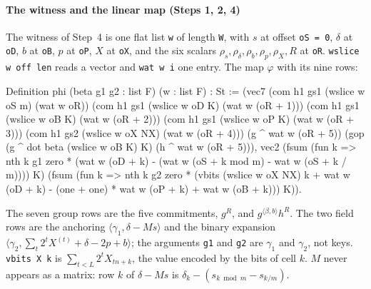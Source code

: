 \documentclass[11pt,a4paper]{article}
\newcommand{\rocq}[1]{\texttt{#1}}
\theoremstyle{remark}
\begin{document}
\paragraph{The witness and the linear map (Steps 1, 2, 4)} The witness of
Step~4 is one flat list \rocq{w} of length \rocq{W}, with $s$ at offset
\rocq{oS = 0}, $\delta$ at \rocq{oD}, $b$ at \rocq{oB}, $p$ at \rocq{oP},
$X$ at \rocq{oX}, and the six scalars $\rho_s, \rho_\delta, \rho_b,
\rho_p, \rho_X, R$ at \rocq{oR}. \rocq{wslice w off len} reads a vector
and \rocq{wat w i} one entry. The map $\varphi$ with its nine rows:
\begin{coq}
Definition phi (beta g1 g2 : list F) (w : list F) : St :=
  (vec7 (com h1 gs1 (wslice w oS m) (wat w oR))
        (com h1 gs1 (wslice w oD K) (wat w (oR + 1)))
        (com h1 gs1 (wslice w oB K) (wat w (oR + 2)))
        (com h1 gs1 (wslice w oP K) (wat w (oR + 3)))
        (com h1 gs2 (wslice w oX NX) (wat w (oR + 4)))
        (g ^ wat w (oR + 5))
        (gop (g ^ dot beta (wslice w oB K) K) (h ^ wat w (oR + 5))),
   vec2 (fsum (fun k => nth k g1 zero *
            (wat w (oD + k) - (wat w (oS + k mod m) - wat w (oS + k / m)))) K)
        (fsum (fun k => nth k g2 zero *
            (vbits (wslice w oX NX) k + wat w (oD + k)
             - (one + one) * wat w (oP + k) + wat w (oB + k))) K)).
\end{coq}
The seven group rows are the five commitments, $g^{R}$, and $g^{\langle
\beta, b\rangle} h^{R}$. The two field rows are the anchoring $\langle
\gamma_1, \delta - Ms \rangle$ and the binary expansion $\langle \gamma_2,
\sum_t 2^{t} X^{(t)} + \delta - 2p + b \rangle$; the arguments \rocq{g1}
and \rocq{g2} are $\gamma_1$ and $\gamma_2$, not keys. \rocq{vbits X k} is
$\sum_{t < L} 2^{t} X_{tn + k}$, the value encoded by the bits of cell
$k$. $M$ never appears as a matrix: row $k$ of $\delta - Ms$ is
$\delta_k - (s_{k \bmod m} - s_{k / m})$.
\end{document}
